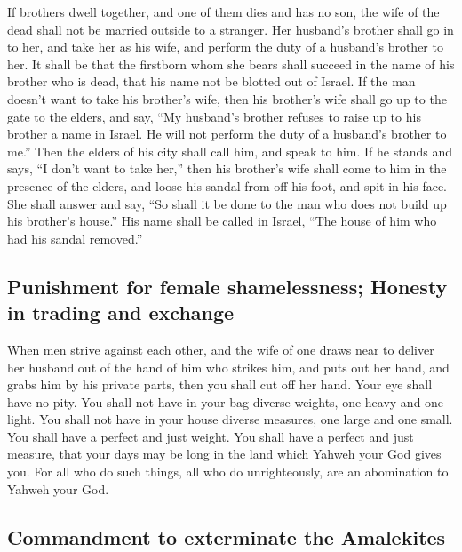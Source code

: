  If brothers dwell together, and one of them dies and has
no son, the wife of the dead shall not be married outside to a stranger.
Her husband's brother shall go in to her, and take her as his wife, and
perform the duty of a husband's brother to her.  It shall
be that the firstborn whom she bears shall succeed in the name of his
brother who is dead, that his name not be blotted out of Israel.
 If the man doesn't want to take his brother's wife, then
his brother's wife shall go up to the gate to the elders, and say, ``My
husband's brother refuses to raise up to his brother a name in Israel.
He will not perform the duty of a husband's brother to me.''
 Then the elders of his city shall call him, and speak to
him. If he stands and says, ``I don't want to take her,'' 
then his brother's wife shall come to him in the presence of the elders,
and loose his sandal from off his foot, and spit in his face. She shall
answer and say, ``So shall it be done to the man who does not build up
his brother's house.''  His name shall be called in
Israel, ``The house of him who had his sandal removed.''

\hypertarget{punishment-for-female-shamelessness-honesty-in-trading-and-exchange}{%
\subsection{Punishment for female shamelessness; Honesty in trading and
exchange}\label{punishment-for-female-shamelessness-honesty-in-trading-and-exchange}}

 When men strive against each other, and the wife of one
draws near to deliver her husband out of the hand of him who strikes
him, and puts out her hand, and grabs him by his private parts,
 then you shall cut off her hand. Your eye shall have no
pity.  You shall not have in your bag diverse weights,
one heavy and one light.  You shall not have in your
house diverse measures, one large and one small.  You
shall have a perfect and just weight. You shall have a perfect and just
measure, that your days may be long in the land which Yahweh your God
gives you.  For all who do such things, all who do
unrighteously, are an abomination to Yahweh your God.

\hypertarget{commandment-to-exterminate-the-amalekites}{%
\subsection{Commandment to exterminate the
Amalekites}\label{commandment-to-exterminate-the-amalekites}}

